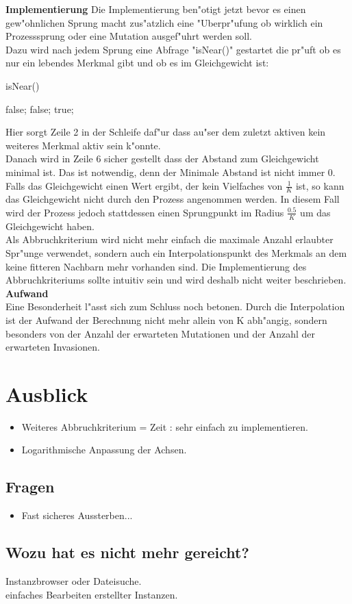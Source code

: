 \documentclass[11pt, a4paper, german]{article}
\theoremstyle{plain}
\begin{document}
	\textbf{Implementierung}
	Die Implementierung ben"otigt jetzt bevor es einen gew"ohnlichen Sprung macht zus"atzlich eine "Uberpr"ufung ob wirklich ein Prozesssprung oder eine Mutation ausgef"uhrt werden soll.\\
	Dazu wird nach jedem Sprung eine Abfrage "isNear()" gestartet die pr"uft ob es nur ein lebendes Merkmal gibt und ob es im Gleichgewicht ist:
	\begin{algorithm}[H]
		\caption{isNear()}
		\begin{algorithmic}[1]
					\Return false;
				\EndIf
			\EndFor
				\Return false;
			\EndIf
			\Return true;
		\end{algorithmic}
	\end{algorithm}
	Hier sorgt Zeile 2 in der Schleife daf"ur dass au"ser dem zuletzt aktiven kein weiteres Merkmal aktiv sein k"onnte.\\
	Danach wird in Zeile 6 sicher gestellt dass der Abstand zum Gleichgewicht minimal ist. Das ist notwendig, denn der Minimale Abstand ist nicht immer $ 0 $. Falls das Gleichgewicht einen Wert ergibt, der kein Vielfaches von $ \frac{1}{K} $ ist, so kann das Gleichgewicht nicht durch den Prozess angenommen werden. In diesem Fall wird der Prozess jedoch stattdessen einen Sprungpunkt im Radius $ \frac{0.5}{K} $ um das Gleichgewicht haben.\\
	Als Abbruchkriterium wird nicht mehr einfach die maximale Anzahl erlaubter Spr"unge verwendet, sondern auch ein Interpolationspunkt des Merkmals an dem keine fitteren Nachbarn mehr vorhanden sind. Die Implementierung des Abbruchkriteriums sollte intuitiv sein und wird deshalb nicht weiter beschrieben.\\
	
	\textbf{Aufwand}\\
	Eine Besonderheit l"asst sich zum Schluss noch betonen. Durch die Interpolation ist der Aufwand der Berechnung nicht mehr allein von K abh"angig, sondern besonders von der Anzahl der erwarteten Mutationen und der Anzahl der erwarteten Invasionen.
	

\clearpage
\section{Ausblick}

\begin{itemize}
	\item Weiteres Abbruchkriterium = Zeit : sehr einfach zu implementieren.
	\item Logarithmische Anpassung der Achsen.
\end{itemize}
\subsection{Fragen}
\begin{itemize}
	\item Fast sicheres Aussterben...
\end{itemize}
\subsection{Wozu hat es nicht mehr gereicht?}
Instanzbrowser oder Dateisuche.\\
einfaches Bearbeiten erstellter Instanzen.\\
\clearpage

\end{document}
